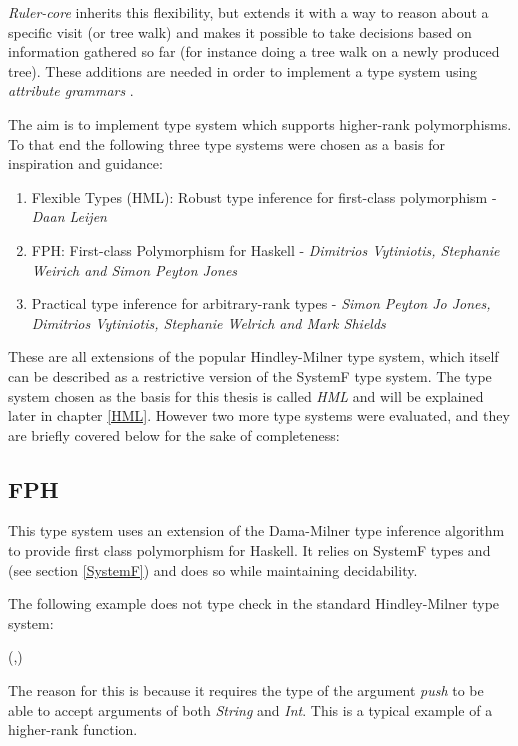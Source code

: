\documentclass[twoside, titlepage, openright, a4paper]{book}
\newcommand{\Varid}[1]{\mathit{#1}}
\def\resethooks{%
  \global\let\SaveRestoreHook\empty
  \global\let\ColumnHook\empty}
\let\hspre\empty
\let\hspost\empty
\newcommand{\ags}{\emph{attribute grammars }}
\newcommand{\Rcore}{\emph{Ruler-core }}
\begin{document}
\Rcore inherits this flexibility, but extends it with a way to reason about a specific visit (or tree walk) and makes it possible to take decisions based on information gathered so far (for instance doing a tree walk on a newly produced tree). These additions are needed in order to implement a type system using \ags.

The aim is to implement type system which supports higher-rank polymorphisms. To that end the following three type systems were chosen as a basis for inspiration and guidance:

\begin{enumerate}
\item Flexible Types (HML): Robust type inference for first-class polymorphism - \textit{Daan Leijen}
\item FPH: First-class Polymorphism for Haskell - \textit{Dimitrios Vytiniotis, Stephanie Weirich and Simon Peyton Jones}
\item Practical type inference for arbitrary-rank types - \textit{Simon Peyton Jo Jones, Dimitrios Vytiniotis, Stephanie Welrich and Mark Shields}
\end{enumerate}

These are all extensions of the popular Hindley-Milner type system, which itself can be described as a restrictive version of the SystemF type system.
The type system chosen as the basis for this thesis is called \emph{HML} and will be explained later in chapter \ref{HML}. However two more type systems were evaluated, and they are briefly covered below for the sake of completeness:

\subsection{FPH\cite{FPH}}
This type system uses an extension of the Dama-Milner type inference algorithm to provide first class polymorphism for Haskell. It relies on SystemF types and (see section \ref{SystemF}) and does so while maintaining decidability. 

The following example does not type check in the standard Hindley-Milner type system:
\begin{hscode}\SaveRestoreHook
\column{B}{@{}>{\hspre}l<{\hspost}@{}}%
\column{E}{@{}>{\hspre}l<{\hspost}@{}}%
\>[B]{}\Varid{f}\;\Varid{push}\mathrel{=}(\Varid{push}\;,\Varid{push}\;){}\<[E]%
\ColumnHook
\end{hscode}\resethooks

The reason for this is because it requires the type of the argument \textit{push} to be able to accept arguments of both \textit{String} and \textit{Int}. This is a typical example of a higher-rank function. 
\end{document}
